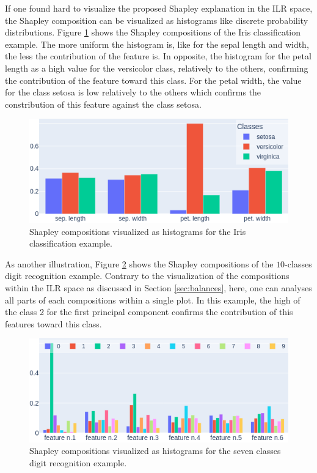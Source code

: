 \documentclass{article}
\theoremstyle{plain}
\theoremstyle{definition}
\theoremstyle{remark}
\begin{document}
If one found hard to visualize the proposed Shapley explanation in the ILR space, the Shapley composition can be visualized as histograms like discrete probability distributions. Figure \ref{fig:histiris} shows the Shapley compositions of the Iris classification example. The more uniform the histogram is, like for the sepal length and width, the less the contribution of the feature is. In opposite, the histogram for the petal length as a high value for the versicolor class, relatively to the others, confirming the contribution of the feature toward this class. For the petal width, the value for the class setosa is low relatively to the others which confirms the constribution of this feature against the class setosa.
\begin{figure}
  \centering
  \includegraphics[width=0.9\linewidth]{figures/3classes/histo}
  \caption{Shapley compositions visualized as histograms for the Iris classification example.}
  \label{fig:histiris}
\end{figure}

As another illustration, Figure \ref{fig:histmore} shows the Shapley compositions of the $10$-classes digit recognition example. Contrary to the visualization of the compositions within the ILR space as discussed in Section \ref{sec:balances}, here, one can analyses all parts of each compositions within a single plot. In this example, the high of the class 2 for the first principal component confirms the contribution of this features toward this class.
\begin{figure}
  \centering
  \includegraphics[width=0.9\linewidth]{figures/moreclasses/histo}
  \caption{Shapley compositions visualized as histograms for the seven classes digit recognition example.}
  \label{fig:histmore}
\end{figure}
\end{document}
